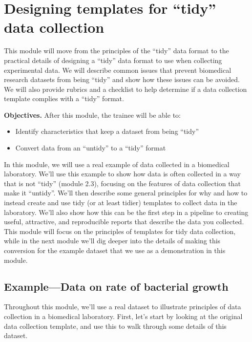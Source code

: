 \documentclass[]{tufte-book}
\providecommand{\tightlist}{%
  \setlength{\itemsep}{0pt}\setlength{\parskip}{0pt}}
\begin{document}
\section{Designing templates for ``tidy'' data collection}\label{module4}

This module will move from the principles of the ``tidy'' data format to the
practical details of designing a ``tidy'' data format to use when collecting
experimental data. We will describe common issues that prevent biomedical
research datasets from being ``tidy'' and show how these issues can be avoided. We
will also provide rubrics and a checklist to help determine if a data collection
template complies with a ``tidy'' format.

\textbf{Objectives.} After this module, the trainee will be able to:

\begin{itemize}
\tightlist
\item
  Identify characteristics that keep a dataset from being ``tidy''
\item
  Convert data from an ``untidy'' to a ``tidy'' format
\end{itemize}

In this module, we will use a real example of data collected in a biomedical
laboratory. We'll use this example to show how data is often collected in a way
that is not ``tidy'' (module 2.3), focusing on the features of data collection
that make it ``untidy''. We'll then describe some general principles for why and
how to instead create and use tidy (or at least tidier) templates to collect
data in the laboratory. We'll also show how this can be the first step in a
pipeline to creating useful, attractive, and reproducible reports that describe
the data you collected. This module will focus on the principles of templates
for tidy data collection, while in the next module we'll dig deeper into the
details of making this conversion for the example dataset that we use as a
demonstration in this module.

\subsection{Example---Data on rate of bacterial growth}\label{exampledata-on-rate-of-bacterial-growth}

Throughout this module, we'll use a real dataset to illustrate principles of
data collection in a biomedical laboratory. First, let's start by looking at the
original data collection template, and use this to walk through some details of
this dataset.
\end{document}
